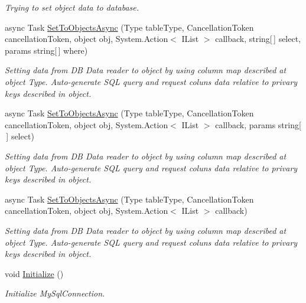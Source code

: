 \begin{DoxyCompactItemize}
\begin{DoxyCompactList}\small\item\em Trying to set object data to database. \end{DoxyCompactList}\item 
async Task \mbox{\hyperlink{class_uniform_data_operator_1_1_sql_1_1_my_sql_1_1_my_sql_data_operator_a5fc9ae81932a2d5259dd817e91593988}{Set\+To\+Objects\+Async}} (Type table\+Type, Cancellation\+Token cancellation\+Token, object obj, System.\+Action$<$ I\+List $>$ callback, string\mbox{[}$\,$\mbox{]} select, params string\mbox{[}$\,$\mbox{]} where)
\begin{DoxyCompactList}\small\item\em Setting data from DB Data reader to object by using column map described at object Type. Auto-\/generate S\+QL query and request coluns data relative to privary keys described in object. \end{DoxyCompactList}\item 
async Task \mbox{\hyperlink{class_uniform_data_operator_1_1_sql_1_1_my_sql_1_1_my_sql_data_operator_a1ca50c33ecedb751642e77668da5229f}{Set\+To\+Objects\+Async}} (Type table\+Type, Cancellation\+Token cancellation\+Token, object obj, System.\+Action$<$ I\+List $>$ callback, params string\mbox{[}$\,$\mbox{]} select)
\begin{DoxyCompactList}\small\item\em Setting data from DB Data reader to object by using column map described at object Type. Auto-\/generate S\+QL query and request coluns data relative to privary keys described in object. \end{DoxyCompactList}\item 
async Task \mbox{\hyperlink{class_uniform_data_operator_1_1_sql_1_1_my_sql_1_1_my_sql_data_operator_a28cf5d9cf061019b0e7da5d966c8db63}{Set\+To\+Objects\+Async}} (Type table\+Type, Cancellation\+Token cancellation\+Token, object obj, System.\+Action$<$ I\+List $>$ callback)
\begin{DoxyCompactList}\small\item\em Setting data from DB Data reader to object by using column map described at object Type. Auto-\/generate S\+QL query and request coluns data relative to privary keys described in object. \end{DoxyCompactList}\item 
void \mbox{\hyperlink{class_uniform_data_operator_1_1_sql_1_1_my_sql_1_1_my_sql_data_operator_a5aad834d2ceba598037b6ed19b27db6d}{Initialize}} ()
\begin{DoxyCompactList}\small\item\em Initialize My\+Sql\+Connection. \end{DoxyCompactList}\item 

\end{DoxyCompactItemize}
